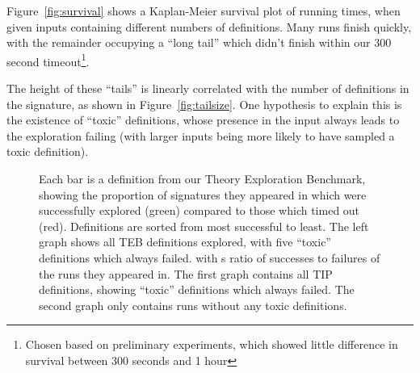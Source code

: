 Figure~\ref{fig:survival} shows a Kaplan-Meier survival plot of \quickspec{}
running times, when given inputs containing different numbers of definitions.
Many runs finish quickly, with the remainder occupying a ``long tail'' which
didn't finish within our 300 second timeout\footnote{Chosen based on preliminary
  experiments, which showed little difference in survival between 300 seconds
  and 1 hour}.

The height of these ``tails'' is linearly correlated with the number of
definitions in the signature, as shown in Figure~\ref{fig:tailsize}. One
hypothesis to explain this is the existence of ``toxic'' definitions, whose
presence in the input always leads to the exploration failing (with larger
inputs being more likely to have sampled a toxic definition).

\begin{figure}
  \scalebox{0.69}{}
  \scalebox{0.69}{}
  \caption[]{Each bar is a definition from our Theory Exploration Benchmark,
    showing the proportion of signatures they appeared in which were
    successfully explored (green) compared to those which timed out (red).
    Definitions are sorted from most successful to least. The left graph shows
    all  TEB definitions explored, with five ``toxic'' definitions which always
    failed. with s ratio of successes to failures of the runs they appeared in. The first graph contains all TIP definitions, showing
    ``toxic'' definitions which always failed. The second graph only contains
    runs without any toxic definitions.}
  \label{fig:proportions}
\end{figure}

